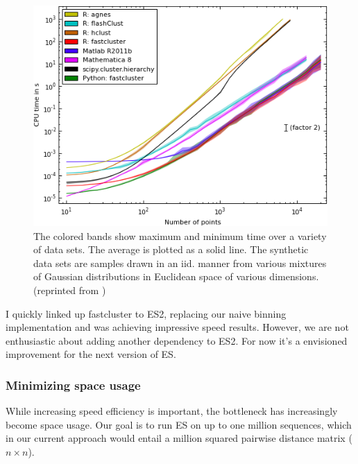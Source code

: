 \begin{figure}[h!]
\centering
\includegraphics[scale=0.7]{images/FastComplete-CH3}
\caption[Complete linkage clustering speed comparison between popular implementations.]{The colored bands show maximum and minimum time over a variety of data sets. The average is plotted as a solid line. The synthetic data sets are samples drawn in an iid. manner from various mixtures of Gaussian distributions in Euclidean space of various dimensions.
(reprinted from \protect\cite{FastClust})}
\label{fig:FastClustComparison}
\end{figure}

I quickly linked up fastcluster to ES2, replacing our naive binning implementation and was achieving impressive speed results. However, we are not enthusiastic about adding another dependency to ES2. For now it's a envisioned improvement for the next version of ES.



\subsubsection*{Minimizing space usage}
While increasing speed efficiency is important, the bottleneck has increasingly become space usage.
Our goal is to run ES on up to one million sequences, which in our current approach would entail a million squared pairwise distance matrix ($n \times n$).

